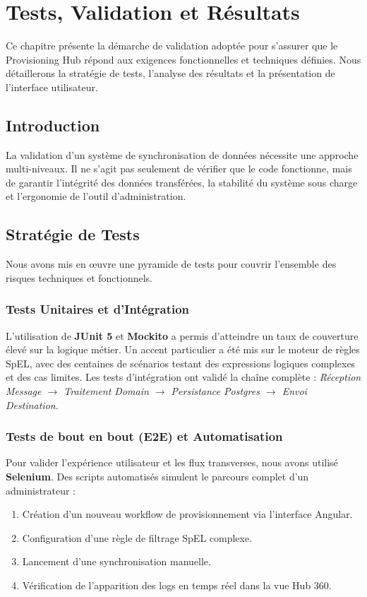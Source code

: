 \chapter{Tests, Validation et Résultats}
\label{chap:tests}

Ce chapitre présente la démarche de validation adoptée pour s'assurer que le Provisioning Hub répond aux exigences fonctionnelles et techniques définies. Nous détaillerons la stratégie de tests, l'analyse des résultats et la présentation de l'interface utilisateur.

\section{Introduction}
La validation d'un système de synchronisation de données nécessite une approche multi-niveaux. Il ne s'agit pas seulement de vérifier que le code fonctionne, mais de garantir l'intégrité des données transférées, la stabilité du système sous charge et l'ergonomie de l'outil d'administration.

\section{Stratégie de Tests}
\label{sec:strategie_tests}

Nous avons mis en œuvre une pyramide de tests pour couvrir l'ensemble des risques techniques et fonctionnels.

\subsection{Tests Unitaires et d'Intégration}
L'utilisation de \textbf{JUnit 5} et \textbf{Mockito} a permis d'atteindre un taux de couverture élevé sur la logique métier. Un accent particulier a été mis sur le moteur de règles SpEL, avec des centaines de scénarios testant des expressions logiques complexes et des cas limites. Les tests d'intégration ont validé la chaîne complète : \textit{Réception Message $\rightarrow$ Traitement Domain $\rightarrow$ Persistance Postgres $\rightarrow$ Envoi Destination}.

\subsection{Tests de bout en bout (E2E) et Automatisation}
Pour valider l'expérience utilisateur et les flux transverses, nous avons utilisé \textbf{Selenium}. Des scripts automatisés simulent le parcours complet d'un administrateur :
\begin{enumerate}
    \item Création d'un nouveau workflow de provisionnement via l'interface Angular.
    \item Configuration d'une règle de filtrage SpEL complexe.
    \item Lancement d'une synchronisation manuelle.
    \item Vérification de l'apparition des logs en temps réel dans la vue Hub 360.
\end{enumerate}

